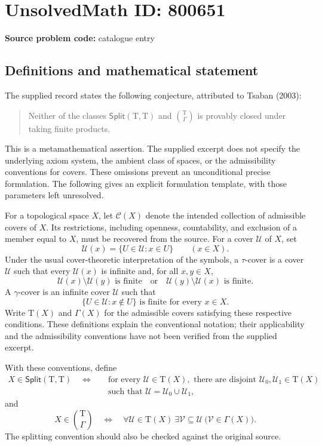 \documentclass[11pt]{article}
\begin{document}
\section*{UnsolvedMath ID: 800651}
\textbf{Source problem code:} catalogue entry
\subsection{Definitions and mathematical statement}
The supplied record states the following conjecture, attributed to Tsaban (2003):
\begin{quote}
Neither of the classes $\mathsf{Split}(\mathrm{T},\mathrm{T})$ and $\binom{\mathrm{T}}{\Gamma}$ is provably closed under taking finite products.
\end{quote}
This is a metamathematical assertion. The supplied excerpt does not specify the underlying axiom system, the ambient class of spaces, or the admissibility conventions for covers. These omissions prevent an unconditional precise formulation. The following gives an explicit formulation template, with those parameters left unresolved.

For a topological space $X$, let $\mathcal C(X)$ denote the intended collection of admissible covers of $X$. Its restrictions, including openness, countability, and exclusion of a member equal to $X$, must be recovered from the source. For a cover $\mathcal U$ of $X$, set
\[
\mathcal U(x)=\{U\in\mathcal U:x\in U\}\qquad(x\in X).
\]
Under the usual cover-theoretic interpretation of the symbols, a $\tau$-cover is a cover $\mathcal U$ such that every $\mathcal U(x)$ is infinite and, for all $x,y\in X$,
\[
\mathcal U(x)\setminus\mathcal U(y)\text{ is finite}
\quad\text{or}\quad
\mathcal U(y)\setminus\mathcal U(x)\text{ is finite}.
\]
A $\gamma$-cover is an infinite cover $\mathcal U$ such that
\[
\{U\in\mathcal U:x\notin U\}\text{ is finite for every }x\in X.
\]
Write $\mathrm T(X)$ and $\Gamma(X)$ for the admissible covers satisfying these respective conditions. These definitions explain the conventional notation; their applicability and the admissibility conventions have not been verified from the supplied excerpt.

With these conventions, define
\[
\begin{aligned}
X\in\mathsf{Split}(\mathrm T,\mathrm T)
\quad\Longleftrightarrow\quad&
\text{for every }\mathcal U\in\mathrm T(X),\text{ there are disjoint }\mathcal U_0,\mathcal U_1\in\mathrm T(X)\\
&\text{such that }\mathcal U=\mathcal U_0\cup\mathcal U_1,
\end{aligned}
\]
and
\[
X\in\binom{\mathrm T}{\Gamma}
\quad\Longleftrightarrow\quad
\forall\mathcal U\in\mathrm T(X)\ \exists\mathcal V\subseteq\mathcal U\ 
\bigl(\mathcal V\in\Gamma(X)\bigr).
\]
The splitting convention should also be checked against the original source.
\end{document}
